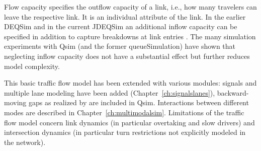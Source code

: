 Flow capacity specifies the outflow capacity of a link, i.e., how many travelers can leave the respective link. It is an individual attribute of the link. In the earlier DEQSim and in the current JDEQSim an additional inflow capacity can be specified in addition to capture breakdowns at link entries \citep[][p.99]{Charypar_PhDThesis_2008}. The many simulation experiments with Qsim (and the former queueSimulation) have shown that neglecting inflow capacity does not have a substantial effect but further reduces model complexity. 

This basic traffic flow model has been extended with various modules: signals and multiple lane modeling have been added (Chapter~\ref{ch:signalslanes}), backward-moving gaps as realized by \citet[][]{Charypar_PhDThesis_2008} are included in Qsim. Interactions between different modes are described in Chapter~\ref{ch:multimodalsim}. Limitations of the traffic flow model concern link dynamics (in particular overtaking and slow drivers) and intersection dynamics (in particular turn restrictions not explicitly modeled in the network). 


